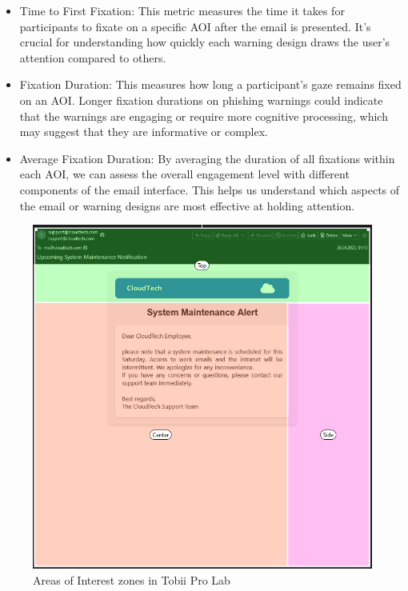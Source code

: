 \documentclass[
  a4paper,  %
  twoside,  %
  bibliography=totoc,
  headsepline,
  cleardoublepage=empty,
  parskip=half,
  draft=false
]{scrbook}
\begin{document}
\begin{itemize}
    \item Time to First Fixation: This metric measures the time it takes for participants to fixate on a specific AOI after the email is presented. It's crucial for understanding how quickly each warning design draws the user's attention compared to others.
    \item Fixation Duration: This measures how long a participant's gaze remains fixed on an AOI. Longer fixation durations on phishing warnings could indicate that the warnings are engaging or require more cognitive processing, which may suggest that they are informative or complex.
    \item Average Fixation Duration: By averaging the duration of all fixations within each AOI, we can assess the overall engagement level with different components of the email interface. This helps us understand which aspects of the email or warning designs are most effective at holding attention.
\end{itemize}

\begin{figure} [ht]
    \centering
    \includegraphics[width=0.8\linewidth]{figures/aoi.png}
    \caption{Areas of Interest zones in Tobii Pro Lab}
    \label{fig:aoi}
\end{figure}

\end{document}
